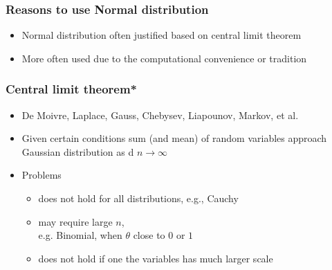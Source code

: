 \documentclass[english,t]{beamer}
\begin{document}
\begin{frame}

  \frametitle{Reasons to use Normal distribution}

  \begin{itemize}
  \item Normal distribution often justified based on central limit theorem
  \item More often used due to the computational convenience or tradition
  \end{itemize}

\end{frame}

\begin{frame}

  \frametitle{Central limit theorem*}

  \begin{itemize}
  \item De Moivre, Laplace, Gauss, Chebysev, Liapounov, Markov, et al.
  \item Given certain conditions sum (and mean) of random variables
    approach Gaussian distribution as d $n \rightarrow \infty$
  \item Problems
    \begin{itemize}
    \item does not hold for all distributions, e.g., Cauchy
    \item may require large $n$,\\ e.g.
      Binomial, when $\theta$ close to $0$ or $1$
    \item does not hold if one the variables has much larger scale
    \end{itemize}
  \end{itemize}

\end{frame}


\end{document}
